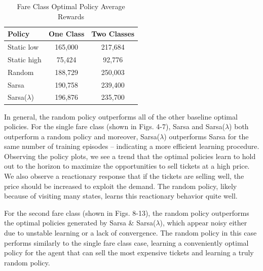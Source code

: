 \documentclass[letterpaper]{article}%
\begin{document}
\begin{table}[h!]
 \caption{Fare Class Optimal Policy Average Rewards}
    \vspace{10 pt}
    \label{tab:fare-class-rewards}
    \centering
    \begin{tabular}{l|cc}
        \hline \hline
        \textbf{Policy} & \textbf{One Class} & \textbf{Two Classes} \\ \hline
        Static low       & 165,000 & 217,684 \\
        Static high      & 75,424 & 92,776 \\
        Random           & 188,729 & 250,003 \\
        Sarsa            & 190,758 & 239,400 \\
        Sarsa($\lambda$) & 196,876 & 235,700 \\
        \hline \hline
    \end{tabular}
\end{table}

In general, the random policy outperforms all of the other baseline optimal policies. For the single fare class (shown in Figs. 4-7), Sarsa and Sarsa($\lambda$) both outperform a random policy and moreover, Sarsa($\lambda$) outperforms Sarsa for the same number of training episodes -- indicating a more efficient learning procedure. Observing the policy plots, we see a trend that the optimal policies learn to hold out to the horizon to maximize the opportunities to sell tickets at a high price. We also observe a reactionary response that if the tickets are selling well, the price should be increased to exploit the demand. The random policy, likely because of visiting many states, learns this reactionary behavior quite well.

For the second fare class (shown in Figs. 8-13), the random policy outperforms the optimal policies generated by Sarsa \& Sarsa($\lambda$), which appear noisy either due to unstable learning or a lack of convergence. The random policy in this case performs similarly to the single fare class case, learning a conveniently optimal policy for the agent that can sell the most expensive tickets and learning a truly random policy. 
\end{document}
